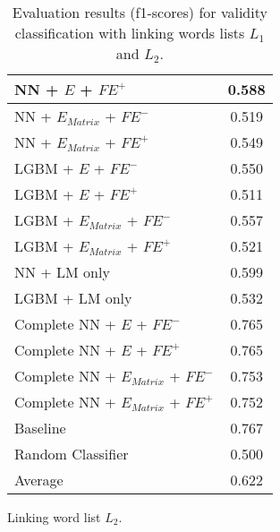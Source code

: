 \begin{table}[h]
\begin{subtable}{.5\textwidth}
\begin{tabular}{|| l || c ||}
 			NN + $E$ + $\textit{FE}^+$ & 0.588 \\
 			\hline
 			NN + $E_{Matrix}$ + $\textit{FE}^-$ & 0.519 \\
 			\hline
 			NN + $E_{Matrix}$ + $\textit{FE}^+$ & 0.549 \\
 			\hline
 			LGBM + $E$ + $\textit{FE}^-$ &  0.550 \\
 			\hline
 			LGBM + $E$ + $\textit{FE}^+$ & 0.511 \\
 			\hline
 			LGBM + $E_{Matrix}$ + $\textit{FE}^-$ & 0.557 \\
 			\hline
 			LGBM + $E_{Matrix}$ + $\textit{FE}^+$ & 0.521 \\
 			\hline
 			NN + LM only & 0.599 \\
 			\hline
 			LGBM + LM only & 0.532 \\
 			\hline
 			Complete NN + $E$ + $\textit{FE}^-$ & 0.765 \\
 			\hline
 			Complete NN + $E$ + $\textit{FE}^+$ & 0.765 \\
 			\hline
 			Complete NN + $E_{Matrix}$ + $\textit{FE}^-$ & 0.753 \\
 			\hline
 			Complete NN + $E_{Matrix}$ + $\textit{FE}^+$ & 0.752 \\
 			\hline
 			Baseline & 0.767 \\
 			\hline
 			Random Classifier & 0.500 \\
 			\hline
 			\hline
 			Average & 0.622 \\
 			\hline
		\end{tabular}
		\renewcommand{\arraystretch}{1}
  		\caption{Linking word list $L_2$.}%
  	\end{subtable}
  	\caption{Evaluation results (f1-scores) for validity classification with linking words lists $L_1$ and $L_2$.}%
  	\label{fig:validityresults}
\end{table}


